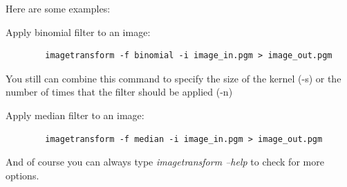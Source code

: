 \documentclass{article}
\begin{document}
	Here are some examples:
	
	Apply binomial filter to an image:
	\begin{lstlisting}	
		imagetransform -f binomial -i image_in.pgm > image_out.pgm
	\end{lstlisting}
	You still can combine this command to specify the size of the kernel (-s) or the number of times that the filter should be applied (-n)	
	
	Apply median filter to an image:
	\begin{lstlisting}	
		imagetransform -f median -i image_in.pgm > image_out.pgm
	\end{lstlisting}	

	And of course you can always type {\it imagetransform --help} to check for more options. 
\end{document}
